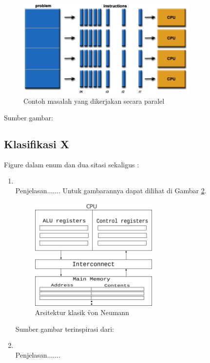 \begin{figure}
	\centering
	\includegraphics[width=0.8\textwidth]
		{pics/parallelProblem.png}
	\caption{Contoh masalah yang dikerjakan secara paralel}
	\label{fig:exmasalahparalel}
\end{figure}
\vspace{-0.8cm}
\begin{center}
{\small Sumber gambar: \citep{net.oxford}}
\end{center}

\subsection{Klasifikasi X}
Figure dalam enum dan dua sitasi sekaligus \citep{book.buyya,book.sterling-jones} :  
\begin{enumerate}
\item {} \\
Penjelasan....... Untuk gambarannya dapat dilihat di Gambar \ref{fig:neumann}.

\begin{figure}
	\centering
	\includegraphics[height=0.65\textwidth,width=0.6\textwidth]
		{pics/neumann.pdf}
	\caption{Arsitektur klasik \f{von Neumann}}
	\label{fig:neumann}
\end{figure}
\vspace{-1.2cm}
\begin{center}
{\small Sumber gambar terinspirasi dari: \citep{buku.pressman}}
\end{center} 

\item {} \\
Penjelasan.......
\end{enumerate}
